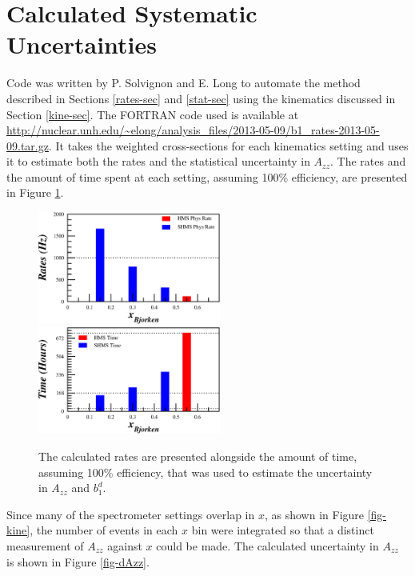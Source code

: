 \documentclass[11pt]{article}
\begin{document}
\newpage 
\section{Calculated Systematic Uncertainties}
\label{results-sec}
Code was written by P. Solvignon and E. Long to automate the method described in Sections \ref{rates-sec} and \ref{stat-sec} using the kinematics discussed in Section \ref{kine-sec}. The FORTRAN code used is available at \url{http://nuclear.unh.edu/~elong/analysis_files/2013-05-09/b1_rates-2013-05-09.tar.gz}. It takes the weighted cross-sections for each kinematics setting and uses it to estimate both the rates and the statistical uncertainty in $A_{zz}$. The rates and the amount of time spent at each setting, assuming 100\% efficiency, are presented in Figure \ref{fig:rates}.

\begin{figure}
	\begin{center}
	\includegraphics[width=6cm]{hms_shms_rates.eps} \hspace{10px} \includegraphics[width=6cm]{hms_shms_time.eps}	
	\end{center}
	\caption [Rates and Time] {The calculated rates are presented alongside the amount of time, assuming 100\% efficiency, that was used to estimate the uncertainty in $A_{zz}$ and $b_1^d$.}
	\label{fig:rates}
\end{figure}


Since many of the spectrometer settings overlap in $x$, as shown in Figure \ref{fig-kine}, the number of events in each $x$ bin were integrated so that a distinct measurement of $A_{zz}$ against $x$ could be made. The calculated uncertainty in $A_{zz}$ is shown in Figure \ref{fig-dAzz}.
\end{document}

